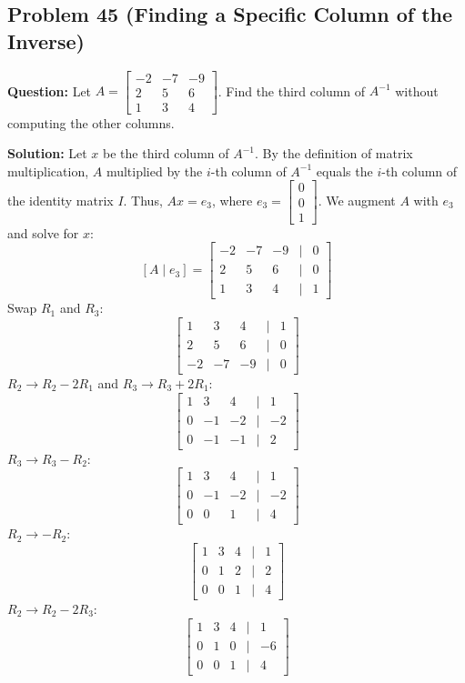\documentclass[12pt]{article}
\begin{document}
\subsection{Problem 45 (Finding a Specific Column of the Inverse)}
\textbf{Question:} Let $A = \begin{bmatrix} -2 & -7 & -9 \\ 2 & 5 & 6 \\ 1 & 3 & 4 \end{bmatrix}$. Find the third column of $A^{-1}$ without computing the other columns.

\textbf{Solution:}
Let $x$ be the third column of $A^{-1}$. By the definition of matrix multiplication, $A$ multiplied by the $i$-th column of $A^{-1}$ equals the $i$-th column of the identity matrix $I$. Thus, $Ax = e_3$, where $e_3 = \begin{bmatrix} 0 \\ 0 \\ 1 \end{bmatrix}$.
We augment $A$ with $e_3$ and solve for $x$:
\[ [A \mid e_3] = \begin{bmatrix} -2 & -7 & -9 & \mid & 0 \\ 2 & 5 & 6 & \mid & 0 \\ 1 & 3 & 4 & \mid & 1 \end{bmatrix} \]
Swap $R_1$ and $R_3$:
\[ \begin{bmatrix} 1 & 3 & 4 & \mid & 1 \\ 2 & 5 & 6 & \mid & 0 \\ -2 & -7 & -9 & \mid & 0 \end{bmatrix} \]
$R_2 \to R_2 - 2R_1$ and $R_3 \to R_3 + 2R_1$:
\[ \begin{bmatrix} 1 & 3 & 4 & \mid & 1 \\ 0 & -1 & -2 & \mid & -2 \\ 0 & -1 & -1 & \mid & 2 \end{bmatrix} \]
$R_3 \to R_3 - R_2$:
\[ \begin{bmatrix} 1 & 3 & 4 & \mid & 1 \\ 0 & -1 & -2 & \mid & -2 \\ 0 & 0 & 1 & \mid & 4 \end{bmatrix} \]
$R_2 \to -R_2$:
\[ \begin{bmatrix} 1 & 3 & 4 & \mid & 1 \\ 0 & 1 & 2 & \mid & 2 \\ 0 & 0 & 1 & \mid & 4 \end{bmatrix} \]
$R_2 \to R_2 - 2R_3$:
\[ \begin{bmatrix} 1 & 3 & 4 & \mid & 1 \\ 0 & 1 & 0 & \mid & -6 \\ 0 & 0 & 1 & \mid & 4 \end{bmatrix} \]
\end{document}
